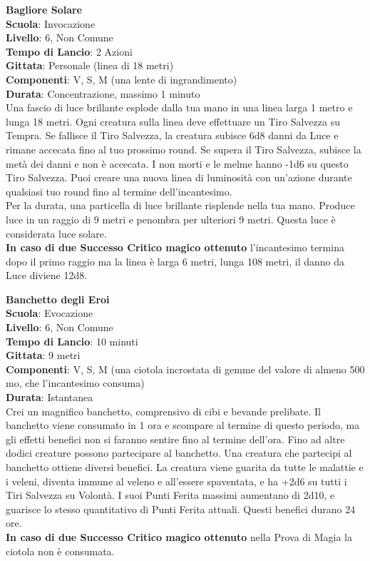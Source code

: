 \begin{multicols}{2}
\medskip\textbf{Bagliore Solare}\\
\textbf{Scuola}: Invocazione\\
\textbf{Livello}: 6, Non Comune\\
\textbf{Tempo di Lancio}: 2 Azioni\\
\textbf{Gittata}: Personale (linea di 18 metri)\\
\textbf{Componenti}: V, S, M (una lente di ingrandimento)\\
\textbf{Durata}: Concentrazione, massimo 1 minuto\\
Una fascio di luce brillante esplode dalla tua mano in una linea larga 1 metro e lunga 18 metri. Ogni creatura sulla linea deve effettuare un Tiro Salvezza su Tempra. Se fallisce il Tiro Salvezza, la creatura subisce 6d8 danni da Luce e rimane accecata fino al tuo prossimo round. Se supera il Tiro Salvezza, subisce la metà dei danni e non è accecata. I non morti e le melme hanno -1d6 su questo Tiro Salvezza. Puoi creare una nuova linea di luminosità con un'azione durante qualsiasi tuo round fino al termine dell'incantesimo.\\
Per la durata, una particella di luce brillante risplende nella tua mano. Produce luce in un raggio di 9 metri e penombra per ulteriori 9 metri. Questa luce è considerata luce solare.\\
\textbf{In caso di due Successo Critico magico ottenuto} l'incantesimo termina dopo il primo raggio ma la linea è larga 6 metri, lunga 108 metri, il danno da Luce diviene 12d8.

\medskip\textbf{Banchetto degli Eroi}\\
\textbf{Scuola}: Evocazione\\
\textbf{Livello}: 6, Non Comune\\
\textbf{Tempo di Lancio}: 10 minuti\\
\textbf{Gittata}: 9 metri\\
\textbf{Componenti}: V, S, M (una ciotola incrostata di gemme del valore di almeno 500 mo, che l'incantesimo consuma)\\
\textbf{Durata}: Istantanea\\
Crei un magnifico banchetto, comprensivo di cibi e bevande prelibate. Il banchetto viene consumato in 1 ora e scompare al termine di questo periodo, ma gli effetti benefici non si faranno sentire fino al termine dell'ora. Fino ad altre dodici creature possono
partecipare al banchetto. Una creatura che partecipi al banchetto ottiene diversi benefici. La creatura viene guarita da tutte le malattie e i veleni, diventa immune al veleno e all'essere spaventata, e ha +2d6 su tutti i Tiri Salvezza su Volontà. I suoi Punti Ferita massimi aumentano di 2d10, e guarisce lo stesso quantitativo di Punti Ferita attuali. Questi benefici durano 24 ore.\\
\textbf{In caso di due Successo Critico magico ottenuto} nella Prova di Magia la ciotola non è consumata.


\end{multicols}
